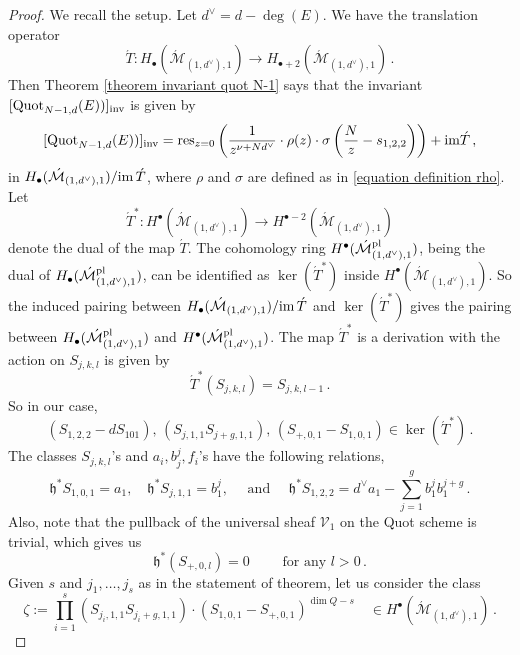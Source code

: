 \documentclass[11pt]{amsart}
\theoremstyle{remark}
\newcommand{\mf}[1]{\mathfrak{#1}}
\newcommand{\Mdash}{\acute{\mathcal{M}}}
\newcommand{\V}{\mathcal{V}}
\newcommand{\im}{\textnormal{im}\,}
\newcommand{\quot}[0]{\textnormal{Quot}}
\newcommand{\inv}[0]{\textnormal{inv}}
\newcommand{\pl}[0]{\textnormal{pl}}
\newcommand{\res}{\textnormal{res}}
\newcommand{\du}{d^\vee}
\numberwithin{theorem}{section}
\begin{document}
\begin{proof}
We recall the setup.
Let $\du = d -\deg(E)$.
We have the translation operator
$$\acute T : H_{\bullet}(\Mdash_{(1,\du),1}) \to  H_{\bullet+2}(\Mdash_{(1,\du),1})\,.$$
Then Theorem \ref{theorem invariant quot N-1} says that the invariant 
    $[\quot_{N-1,d}(E))]_\inv$ is given by
    \begin{equation}\label{equation quot N-1 invariant}
    [\quot_{N-1,d}(E))]_\inv = 
    \res_{z=0} \left( \frac{1}{z^{\nu+N\du}} \cdot \rho(z) \cdot \sigma\left(\frac{N}{z} -s_{1,2,2}\right)\right) + \textnormal{im} \acute{T}\,,
    \end{equation}
    in $H_\bullet(\Mdash_{(1,\du),1})/\im \acute T$,
    where $\rho$ and $\sigma$ are defined as in \eqref{equation definition rho}.
Let 
$$\acute{T}^* : H^\bullet(\Mdash_{(1,\du),1}) \to H^{\bullet -2}(\Mdash_{(1,\du),1})$$ 
denote the dual of the map $\acute{T}$. 
The cohomology ring $H^\bullet(\Mdash^\pl_{(1,\du),1})$, 
being the dual of $H_\bullet(\Mdash^\pl_{(1,\du),1})$,
can be identified as $\ker (\acute{T}^*)$ inside $H^\bullet(\Mdash_{(1,\du),1})$.
So the induced pairing between $H_\bullet(\Mdash_{(1,\du),1})/\im \acute{T}$ and $\ker (\acute{T}^*)$
gives the pairing between
$H_\bullet(\Mdash^\pl_{(1,\du),1})$ and $H^\bullet(\Mdash^\pl_{(1,\du),1})$.
The map $\acute{T}^*$ is a derivation with the action on $S_{j,k,l}$ is given by
$$\acute{T}^* (S_{j,k,l}) = S_{j,k,l-1} \,.$$
So in our case,  
\begin{equation}\label{elements of kernel Tdual}
(S_{1,2,2} - dS_{101}),\, (S_{j,1,1}S_{j+g,1,1}), \, 
(S_{+,0,1} - S_{1,0,1})
\in \ker(\acute{T}^*)\,.
\end{equation}
The classes $S_{j,k,l}$'s and $a_i, b_j^j, f_i$'s have the following relations,
\begin{equation}\label{relations of tautological classes}
    \mf h^* S_{1,0,1}=a_1, \quad  
    \mf h^* S_{j,1,1}=b_1^j, 
\quad \text{ and }  
\quad \mf h^* S_{1,2,2} = d^\vee a_1 - \sum_{j=1}^g {b_1^jb_1^{j+g}} \,.
\end{equation}
Also, note that the pullback of the universal sheaf $\V_1$ on the Quot scheme is trivial, which gives us 
$$ \mf h^*(S_{+,0,l}) = 0 \qquad \text{ for any } l>0 \,.$$
    Given $s$ and $j_1,\dots,j_s$ as in the statement of theorem,
    let us consider the class
    $$\zeta:= \prod_{i=1}^s \left(S_{j_i,1,1}S_{j_i+g,1,1} \right) \cdot
    (S_{1,0,1}-S_{+,0,1})^{\dim Q-s} \quad \in 
    H^\bullet(\Mdash_{(1,\du),1})\,.$$

\end{proof}
\end{document}
